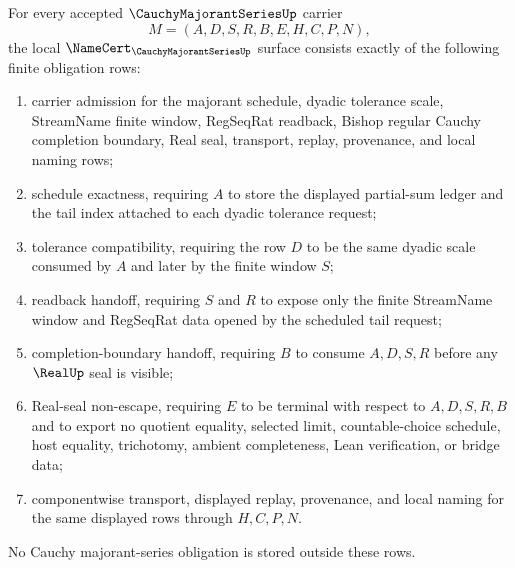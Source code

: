 \begin{theorem}
\label{thm:cauchy-majorant-series-namecert-obligations}
For every accepted $\CauchyMajorantSeriesUp$ carrier
$$
M=(A,D,S,R,B,E,H,C,P,N),
$$
the local $\NameCert_{\CauchyMajorantSeriesUp}$ surface consists exactly of the following finite obligation rows:
\begin{enumerate}
\item carrier admission for the majorant schedule, dyadic tolerance scale, StreamName finite window, RegSeqRat readback, Bishop regular Cauchy completion boundary, Real seal, transport, replay, provenance, and local naming rows;
\item schedule exactness, requiring $A$ to store the displayed partial-sum ledger and the tail index attached to each dyadic tolerance request;
\item tolerance compatibility, requiring the row $D$ to be the same dyadic scale consumed by $A$ and later by the finite window $S$;
\item readback handoff, requiring $S$ and $R$ to expose only the finite StreamName window and RegSeqRat data opened by the scheduled tail request;
\item completion-boundary handoff, requiring $B$ to consume $A,D,S,R$ before any $\RealUp$ seal is visible;
\item Real-seal non-escape, requiring $E$ to be terminal with respect to $A,D,S,R,B$ and to export no quotient equality, selected limit, countable-choice schedule, host equality, trichotomy, ambient completeness, Lean verification, or bridge data;
\item componentwise transport, displayed replay, provenance, and local naming for the same displayed rows through $H,C,P,N$.
\end{enumerate}
No Cauchy majorant-series obligation is stored outside these rows.
\end{theorem}
